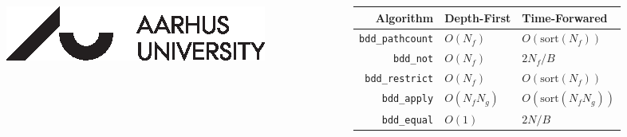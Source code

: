\documentclass[english, aspectratio=169]{beamer}
\newcommand{\sort}[0]{\text{sort}}
\begin{document}
\begin{frame}
\begin{columns}
\begin{column}{0.4\linewidth}
      \includegraphics[width=0.5\linewidth]{external/aulogo_uk_var2_black.eps}
    \end{column}
    \begin{column}{0.6\linewidth}
      \begin{table}
        \centering
        \begin{tabular}{rll}
          Algorithm                 & Depth-First  & Time-Forwared
          \\ \hline \hline
          \lstinline{bdd_pathcount} & $O(N_f)$     & $O(\sort(N_f))$
          \\ \hline
          \lstinline{bdd_not}       & $O(N_f)$     & $2 N_f / B$
          \\
          \lstinline{bdd_restrict}  & $O(N_f)$     & $O(\sort(N_f))$
          \\
          \lstinline{bdd_apply}     & $O(N_f N_g)$ & $O(\sort(N_f  N_g))$
          \\ \hline
          \lstinline{bdd_equal}     & $O(1)$       & $2 N/B$
        \end{tabular}
      \end{table}
    \end{column}
  \end{columns}

\end{frame}
\end{document}
